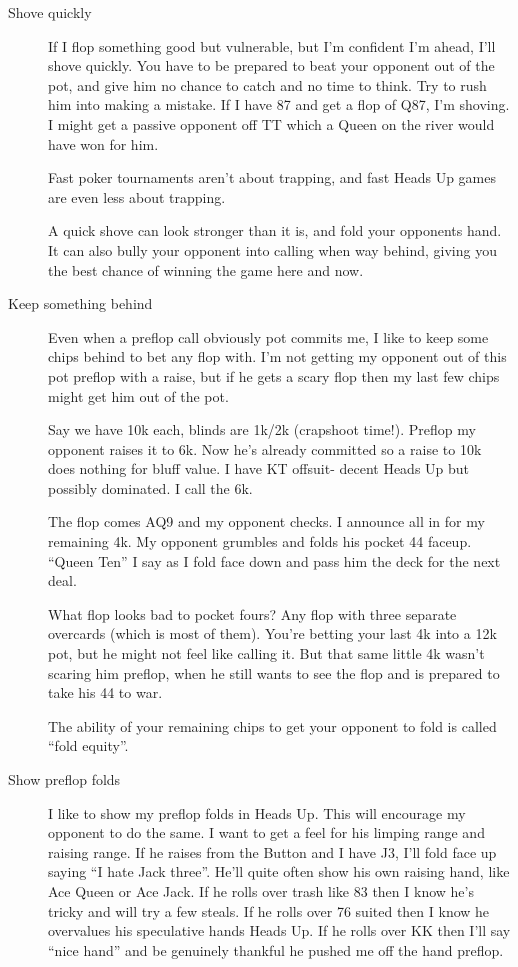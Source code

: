 \begin{description}

\item[Shove quickly] If I flop something good but vulnerable,
but I'm confident I'm ahead, I'll shove quickly. You have
to be prepared to beat your opponent out of the pot, and
give him no chance to catch and no time to think. Try to
rush him into making a mistake. If I have 87 and get a flop
of Q87, I'm shoving. I might get a passive opponent
off TT which a Queen on the river would have won for him.

Fast poker tournaments aren't about trapping, and fast
Heads Up games are even less about trapping.

A quick shove can look stronger than it is, and fold
your opponents hand. It can also bully your opponent
into calling when way behind, giving you the best
chance of winning the game here and now.

\item[Keep something behind] Even when a preflop call obviously
pot commits me, I like to keep some chips behind to bet
any flop with. I'm not getting my opponent out of this
pot preflop with a raise, but if he gets a scary flop
then my last few chips might get him out of the pot.

Say we have 10k each, blinds are 1k/2k (crapshoot time!).
Preflop my opponent raises it to 6k. Now he's already
committed so a raise to 10k does nothing for bluff value.
I have KT offsuit- decent Heads Up but possibly dominated.
I call the 6k.

The flop comes AQ9 and my opponent checks. I announce
all in for my remaining 4k. My opponent grumbles
and folds his pocket 44 faceup. ``Queen Ten'' I say
as I fold face down and pass him the deck for the next deal.

What flop looks bad to pocket fours? Any flop with three
separate overcards (which is most of them). You're betting
your last 4k into a 12k pot, but he might not feel like calling
it. But that same little 4k wasn't scaring him preflop,
when he still wants to see the flop and is prepared to take
his 44 to war.

The ability of your remaining chips to get your opponent to
fold is called ``fold equity''.

\item[Show preflop folds] I like to show my
preflop folds in Heads Up. This will encourage my
opponent to do the same. I want to get a feel for his
limping range and raising range. If he raises from the
Button and I have J3, I'll fold face up saying ``I hate
Jack three''. He'll quite often show his own raising hand,
like Ace Queen or Ace Jack. If he rolls over trash like
83 then I know he's tricky and will try a few steals.
If he rolls over 76 suited then I know he overvalues
his speculative hands Heads Up. If he rolls over KK
then I'll say ``nice hand'' and be genuinely thankful
he pushed me off the hand preflop. 


\end{description}
